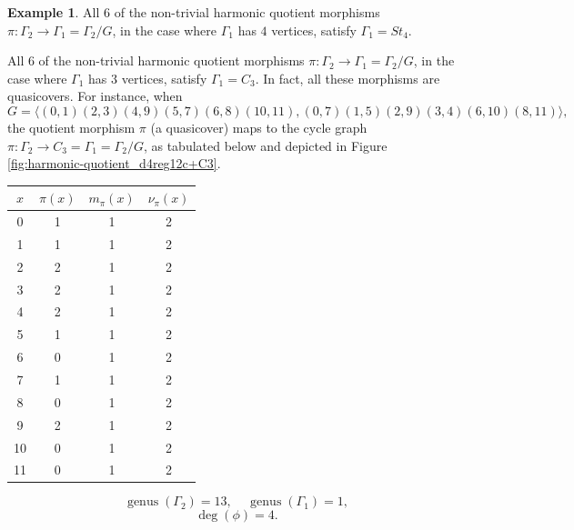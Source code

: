 \documentclass[12pt,letterpaper]{article}
\theoremstyle{definition}
\newtheorem{example}[theorem]{Example}
\DeclareMathOperator{\genus}{genus}
\begin{document}
\begin{example}
{All $6$ of the non-trivial harmonic quotient morphisms
$\pi: \Gamma_2\to \Gamma_1=\Gamma_2/G$, in the case where
$\Gamma_1$ has $4$ vertices, satisfy $\Gamma_1=St_4$.

All $6$ of the non-trivial harmonic quotient morphisms
$\pi: \Gamma_2\to \Gamma_1=\Gamma_2/G$, in the case where
$\Gamma_1$ has $3$ vertices, satisfy $\Gamma_1=C_3$.
In fact, all these morphisms are quasicovers.
For instance, when
\[
G = \langle  (0,1)(2,3)(4,9)(5,7)(6,8)(10,11),
(0,7)(1,5)(2,9)(3,4)(6,10)(8,11)\rangle ,
\]
the quotient morphism $\pi$ (a quasicover) maps to the cycle graph
$\pi: \Gamma_2\to C_3=\Gamma_1=\Gamma_2/G $, as tabulated below
and depicted in
Figure \ref{fig:harmonic-quotient_d4reg12c+C3}. 

\begin{center}
\begin{tabular}{c|c|c|c}  
  $x$ & $\pi(x)$ & $m_\pi(x)$ & $\nu_\pi(x)$   \\ \hline
  0   &    1   &        1         &  2   \\   
  1   &    1   &        1         &  2  \\ 
  2   &    2   &        1         &  2  \\ 
  3   &    2   &        1         &  2  \\ 
  4   &    2   &        1         &  2   \\
  5   &    1   &        1         &  2   \\
  6   &    0   &        1         &  2   \\
  7   &    1   &        1         &  2   \\
  8   &    0   &        1         &  2   \\
  9   &    2   &        1         &  2   \\
  10   &   0   &        1         &  2  \\   
  11   &   0   &        1         &  2  \\
\end{tabular}
\end{center}

\[
  \genus(\Gamma_2) =13,\ \ \ \ \
  \genus(\Gamma_1) =1,
\]
\[
\deg(\phi) =4.
\]

}
\end{example}
\end{document}

